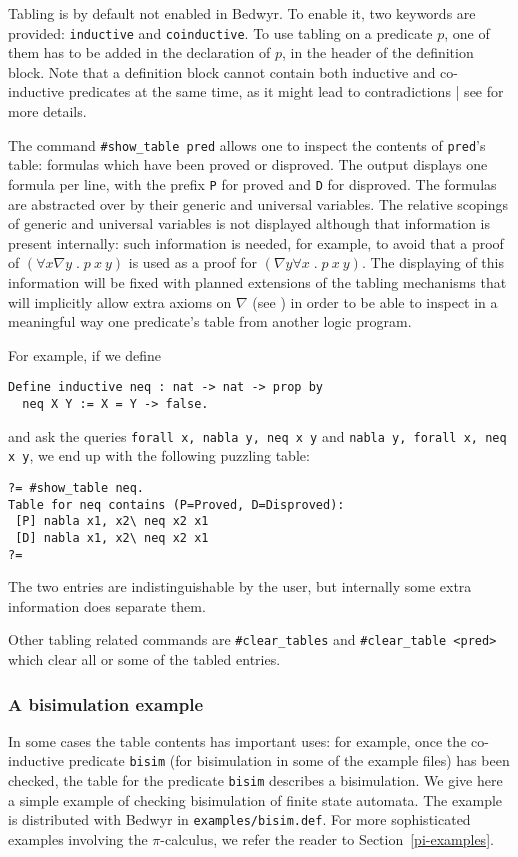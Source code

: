 \documentclass{article}
\newcommand{\qs}{\; . \;}
\begin{document}
Tabling is by default not enabled in Bedwyr. To enable it, two keywords
are provided: \texttt{inductive} and \texttt{coinductive}.
To use tabling on a predicate $p$, one of them has to be added in the
declaration of $p$, in the header of the definition block.
Note that a definition block cannot contain both inductive and
co-inductive predicates at the same time, as it might lead to
contradictions | see \cite{momigliano03types} for more details.

The command \verb/#show_table pred/ allows one to inspect the contents of
\verb.pred.'s table: formulas which have been proved or disproved. The
output displays one formula per line, with the prefix \verb.P. for
proved and \verb.D. for disproved. The formulas are abstracted over by
their generic and universal variables. The relative scopings of generic
and universal variables is not displayed although that information is
present internally: such information is needed, for example, to avoid
that a proof of $(\forall x\nabla y\qs p~x~y)$ is used as a proof for
$(\nabla y\forall x\qs p~x~y)$.  The displaying of this information will
be fixed with planned extensions of the tabling mechanisms that will
implicitly allow extra axioms on $\nabla$ (see \cite{tiu06lfmtp}) in
order to be able to inspect in a meaningful way one predicate's table
from another logic program.

For example, if we define
\begin{verbatim}
Define inductive neq : nat -> nat -> prop by
  neq X Y := X = Y -> false.
\end{verbatim}
and ask the queries \texttt{forall x, nabla y, neq x y}
and \texttt{nabla y, forall x, neq x y}, we end up with the following
puzzling table:
\begin{verbatim}
?= #show_table neq.
Table for neq contains (P=Proved, D=Disproved):
 [P] nabla x1, x2\ neq x2 x1
 [D] nabla x1, x2\ neq x2 x1
?=
\end{verbatim}
The two entries are indistinguishable by the user, but internally some
extra information does separate them.

Other tabling related commands are \verb/#clear_tables/ and
\verb/#clear_table <pred>/ which clear all or some of the tabled entries.

\subsubsection{A bisimulation example}

In some cases the table contents has important uses: for
example, once the co-inductive predicate {\tt bisim} (for bisimulation
in some of the example files) has been checked, the table for the
predicate {\tt bisim} describes a bisimulation.
We give here a simple example of checking bisimulation of finite
state automata.
The example is distributed with Bedwyr in \verb+examples/bisim.def+.
For more sophisticated examples involving the $\pi$-calculus,
we refer the reader to Section~\ref{pi-examples}.
\end{document}
